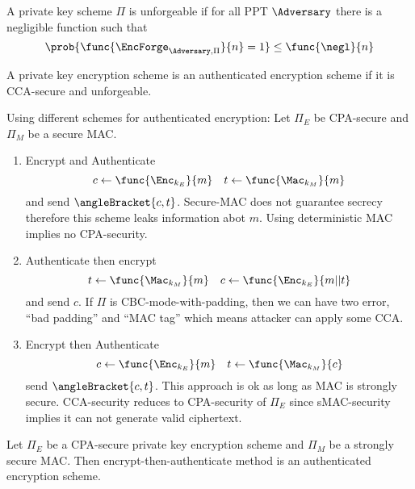 \begin{definition}
    A private key scheme \(\Pi\) is unforgeable if for all PPT \(\Adversary\) there is a negligible function such that 
    \begin{equation*}
        \prob{\func{\EncForge_{\Adversary,\Pi}}{n} = 1} \leq \func{\negl}{n}
    \end{equation*}
\end{definition}

\begin{definition}
    A private key encryption scheme is an authenticated encryption scheme if it is CCA-secure and unforgeable.
\end{definition}

Using different schemes for authenticated encryption: Let \(\Pi_E\) be CPA-secure and \(\Pi_M\) be a secure MAC. 
\begin{enumerate}
    \item Encrypt and Authenticate 
    \begin{equation*}
        c \gets \func{\Enc_{k_E}}{m} \quad t \gets \func{\Mac_{k_M}}{m}
    \end{equation*}
    and send \(\angleBracket{c,t}\). Secure-MAC does not guarantee secrecy therefore this scheme leaks information abot \(m\). Using deterministic MAC implies no CPA-security.
    \item Authenticate then encrypt
    \begin{equation*}
        t \gets \func{\Mac_{k_M}}{m} \quad c \gets \func{\Enc_{k_E}}{m || t}
    \end{equation*}
    and send \(c\). If \(\Pi\) is CBC-mode-with-padding, then we can have two error, ``bad padding'' and ``MAC tag'' which means attacker can apply some CCA. 
    \item Encrypt then Authenticate
    \begin{equation*}
         c \gets \func{\Enc_{k_E}}{m} \quad t \gets \func{\Mac_{k_M}}{c} 
    \end{equation*}
    send \(\angleBracket{c,t}\). This approach is ok as long as MAC is strongly secure. CCA-security reduces to CPA-security of \(\Pi_E\) since sMAC-security implies it can not generate valid ciphertext.
\end{enumerate}

\begin{theorem}
    Let \(\Pi_E\) be a CPA-secure private key encryption scheme and \(\Pi_M\) be a strongly secure MAC. Then encrypt-then-authenticate method is an authenticated encryption scheme.
\end{theorem}

